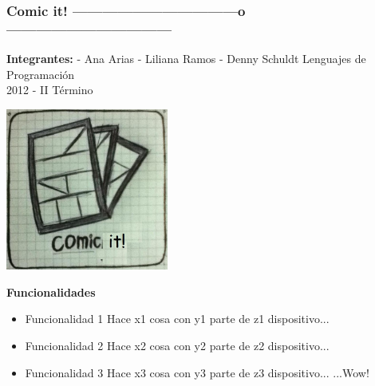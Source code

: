 \documentclass[utf8]{beamer}
\author{Ana, Liliana, Denny}
\begin{document}
	\begin{frame}
		\frametitle{
			\color{black}\textbf{Comic it!}
			\color{gray}---------------------------------o---------------------------------
		}	
	 	\begin{multicols}{2}
		    	\begingroup
				\begin{center} 
					\begingroup
						\textbf{Integrantes:}
					\endgroup
					\newline
					\newline
					- Ana Arias
					\newline
					- Liliana Ramos
					\newline
					- Denny Schuldt
					\newline
					\newline
					Lenguajes de Programación
					\\2012 - II Término
				\end{center} 
			\endgroup
			\pause
			\begin{center} 
				 \includegraphics[width=0.4\textwidth]{comicit.jpg} %
			\end{center} 
			\end{multicols}
	\end{frame}
	\begin{frame}
		\textbf{Funcionalidades}
		\newline
		\begin{itemize}
			\item Funcionalidad 1
			\newline
			Hace x1 cosa con y1 parte de z1 dispositivo...
			\pause
			\item Funcionalidad 2
			\newline
			Hace x2 cosa con y2 parte de z2 dispositivo...
			\pause
			\item Funcionalidad 3
			\newline
			Hace x3 cosa con y3 parte de z3 dispositivo...
			\pause
			\newline
			\newline
			\newline
			\flushright
			...Wow!
		\end{itemize}
	\end{frame}	
\end{document}

